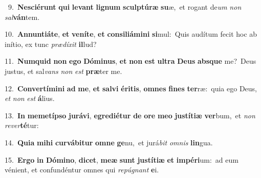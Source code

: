 {{\numbfont\textcolor{\numbcolor}{~9.}}~\-\textbf{Ne}\-\textbf{sci}\textbf{é}\textbf{runt} \textbf{qui} \textbf{le}\-\textbf{vant} \textbf{li}\-\textbf{gnum} \textbf{sculp}\-\textbf{tú}\textbf{ræ} \textbf{su}\-æ,~\star et rogant de\textit{um} \textit{non} \textit{sal}\-\textbf{ván}tem.\par
{\numbfont\textcolor{\numbcolor}{10.}}~\-\textbf{An}\-\textbf{nun}\textbf{ti}\textbf{á}\textbf{te}, \textbf{et} \textbf{ve}\-\textbf{ní}\textbf{te}, \textbf{et} \textbf{con}\-\textbf{si}\textbf{li}\textbf{á}\textbf{mi}\textbf{ni} \textbf{si}\-mul:~\star Quis audítum fecit hoc ab inítio, ex tunc \textit{præ}\-\textit{dí}\textit{xit} \textbf{il}\-lud?\par
{\numbfont\textcolor{\numbcolor}{11.}}~\-\textbf{Num}\-\textbf{quid} \textbf{non} \textbf{e}\-\textbf{go} \textbf{Dó}\-\textbf{mi}\textbf{nus}, \textbf{et} \textbf{non} \textbf{est} \textbf{ul}\-\textbf{tra} \textbf{De}\-\textbf{us} \textbf{abs}\-\textbf{que} me?~\star Deus justus, et sal\textit{vans} \textit{non} \textit{est} \textbf{præ}\-ter me.\par
{\numbfont\textcolor{\numbcolor}{12.}}~\-\textbf{Con}\-\textbf{ver}\textbf{tí}\textbf{mi}\textbf{ni} \textbf{ad} \textbf{me}\-, \textbf{et} \textbf{sal}\-\textbf{vi} \textbf{é}\-\textbf{ri}\textbf{tis}, \textbf{om}\-\textbf{nes} \textbf{fi}\-\textbf{nes} \textbf{ter}\-ræ:~\star quia ego Deus, \textit{et} \textit{non} \textit{est} \textbf{á}\-lius.\par
{\numbfont\textcolor{\numbcolor}{13.}}~\textbf{In} \textbf{me}\-\textbf{met}\textbf{íp}\textbf{so} \textbf{ju}\-\textbf{rá}\textbf{vi}, \textbf{e}\-\textbf{gre}\textbf{di}\textbf{é}\textbf{tur} \textbf{de} \textbf{o}\-\textbf{re} \textbf{me}\-\textbf{o} \textbf{jus}\-\textbf{tí}\textbf{ti}\textbf{æ} \textbf{ver}\-bum,~\star et \textit{non} \textit{re}\-\textit{ver}\textbf{té}tur:\par
{\numbfont\textcolor{\numbcolor}{14.}}~\-\textbf{Qui}\-\textbf{a} \textbf{mi}\-\textbf{hi} \textbf{cur}\-\textbf{vá}\textbf{bi}\textbf{tur} \textbf{om}\-\textbf{ne} \textbf{ge}\-nu,~\star et jurá\textit{bit} \textit{om}\-\textit{nis} \textbf{lin}\-gua.\par
{\numbfont\textcolor{\numbcolor}{15.}}~\-\textbf{Er}\-\textbf{go} \textbf{in} \textbf{Dó}\-\textbf{mi}\textbf{no}, \textbf{di}\-\textbf{cet}, \textbf{me}\-\textbf{æ} \textbf{sunt} \textbf{jus}\-\textbf{tí}\textbf{ti}\textbf{æ} \textbf{et} \textbf{im}\-\textbf{pé}\textbf{ri}um:~\star ad eum vénient, et confundéntur omnes qui \textit{re}\-\textit{pú}\textit{gnant} \textbf{e}\-i.\par
}
